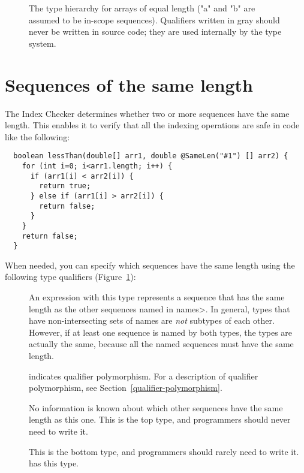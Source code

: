 \begin{figure}
\begin{center}
  \hfill
  \hfill
\end{center}
  \caption{The type hierarchy for arrays of equal length ("a" and "b" are
    assumed to be in-scope sequences).  Qualifiers
    written in gray should never be written in source code; they are used
    internally by the type system.}
  \label{fig-index-array-types}
\end{figure}

\section{Sequences of the same length\label{index-samelen}}

The Index Checker determines whether two or more sequences have the same length.
This enables it to verify that all the indexing operations are safe in code
like the following:

\begin{Verbatim}
  boolean lessThan(double[] arr1, double @SameLen("#1") [] arr2) {
    for (int i=0; i<arr1.length; i++) {
      if (arr1[i] < arr2[i]) {
        return true;
      } else if (arr1[i] > arr2[i]) {
        return false;
      }
    }
    return false;
  }
\end{Verbatim}

When needed, you can specify which sequences have the same length using the following type qualifiers (Figure~\ref{fig-index-array-types}):

\begin{description}
\item[]
  An expression with this type represents a sequence that has the
  same length as the other sequences named in \<names>. In general,
   types that have non-intersecting sets of names
  are \textit{not} subtypes of each other. However, if at least one
  sequence is named by both types, the types are actually the same,
  because all the named sequences must have the same length.
\item[]
  indicates qualifier polymorphism.
  For a description of qualifier polymorphism, see
  Section~\ref{qualifier-polymorphism}.
\item[]
  No information is known about which other sequences have the same length
  as this one.
  This is the top type, and programmers should never need to write it.
\item[]
  This is the bottom type, and programmers should rarely need to write it.
   has this type.
\end{description}


